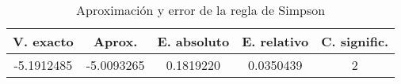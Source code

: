 \begin{table}[h]
  \begin{center}
    \begin{tabular}{|c|c|c|c|c|} \hline 
      \textbf{V. exacto} & \textbf{Aprox.} & \textbf{E. absoluto} & \textbf{E. relativo}& \textbf{C. signific.}\\ 
      \hline
      -5.1912485 & -5.0093265 & 0.1819220 & 0.0350439 & 2
      \\
      \hline
    \end{tabular}
  \end{center}
  \caption{Aproximaci\'on y error de la regla de Simpson}
  \label{tab:3}
\end{table}

